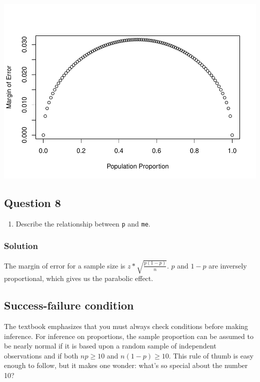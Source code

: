 \documentclass[]{article}
\providecommand{\tightlist}{%
  \setlength{\itemsep}{0pt}\setlength{\parskip}{0pt}}
\begin{document}
\includegraphics{DATA_606_Lab_6_files/figure-latex/me-plot-1.pdf}

\subsection{Question 8}\label{question-8}

\begin{enumerate}
\def\labelenumi{\arabic{enumi}.}
\setcounter{enumi}{7}
\tightlist
\item
  Describe the relationship between \texttt{p} and \texttt{me}.
\end{enumerate}

\subsubsection{Solution}\label{solution-7}

The margin of error for a sample size is
\(z * \sqrt{\frac{p(1-p)}{n}}\). \(p\) and \(1-p\) are inversely
proportional, which gives us the parabolic effect.

\subsection{Success-failure condition}\label{success-failure-condition}

The textbook emphasizes that you must always check conditions before
making inference. For inference on proportions, the sample proportion
can be assumed to be nearly normal if it is based upon a random sample
of independent observations and if both \(np \geq 10\) and
\(n(1 - p) \geq 10\). This rule of thumb is easy enough to follow, but
it makes one wonder: what's so special about the number 10?
\end{document}
